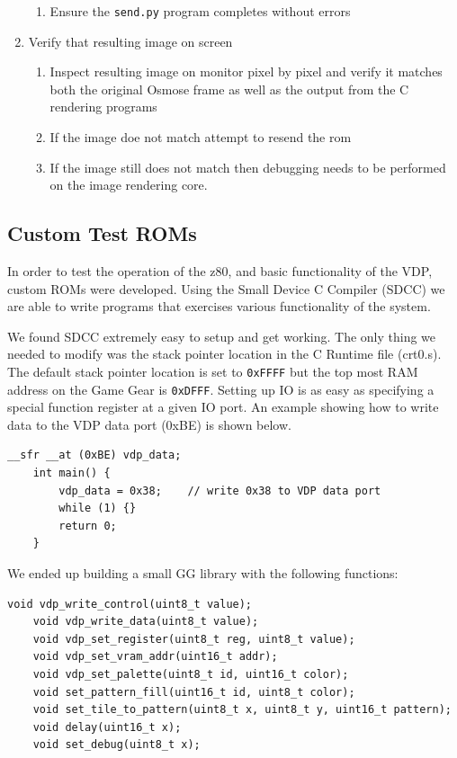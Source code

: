 \documentclass{article}
\begin{document}
\begin{enumerate}
\begin{enumerate}
            \item Ensure the \texttt{send.py} program completes without errors
        \end{enumerate}
    \item Verify that resulting image on screen
        \begin{enumerate}
            \item Inspect resulting image on monitor pixel by pixel and verify it matches both the original Osmose frame as well as the output from the C rendering programs
            \item If the image doe not match attempt to resend the rom
            \item If the image still does not match then debugging needs to be performed on the image rendering core.
        \end{enumerate}
\end{enumerate}

\subsection{Custom Test ROMs}

In order to test the operation of the z80, and basic functionality of the VDP,
custom ROMs were developed. Using the Small Device C Compiler (SDCC)
\cite{SDCC} we are able to write programs that exercises various functionality
of the system.

We found SDCC extremely easy to setup and get working. The only thing we needed
to modify was the stack pointer location in the C Runtime file (crt0.s). The
default stack pointer location is set to \texttt{0xFFFF} but the top most RAM
address on the Game Gear is \texttt{0xDFFF}. Setting up IO is as easy as
specifying a special function register at a given IO port. An example showing
how to write data to the VDP data port (0xBE) is shown below.

\begin{lstlisting}[caption=VDP Data Write]
    __sfr __at (0xBE) vdp_data;
    int main() {
        vdp_data = 0x38;    // write 0x38 to VDP data port
        while (1) {}
        return 0;
    }
\end{lstlisting}

We ended up building a small GG library with the following functions:

\begin{lstlisting}[caption=Game Gear Library Functions]
    void vdp_write_control(uint8_t value);
    void vdp_write_data(uint8_t value);
    void vdp_set_register(uint8_t reg, uint8_t value);
    void vdp_set_vram_addr(uint16_t addr);
    void vdp_set_palette(uint8_t id, uint16_t color);
    void set_pattern_fill(uint16_t id, uint8_t color);
    void set_tile_to_pattern(uint8_t x, uint8_t y, uint16_t pattern);
    void delay(uint16_t x);
    void set_debug(uint8_t x);
\end{lstlisting}
\end{document}
